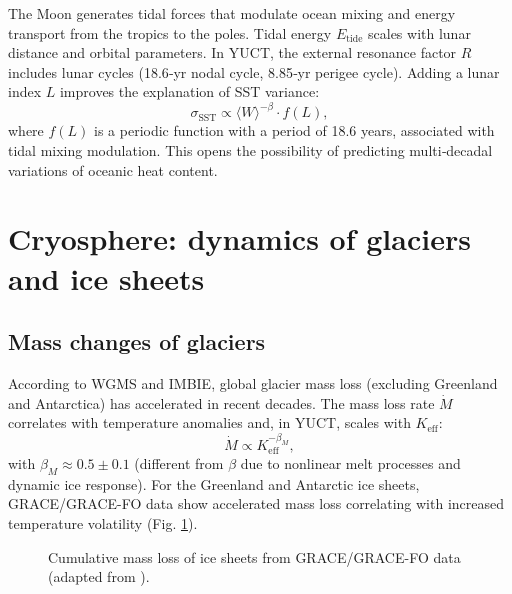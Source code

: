 \documentclass[12pt,a4paper]{article}
\newcommand{\Keff}{K_{\mathrm{eff}}}
\newcommand{\be}{\beta}
\begin{document}
	The Moon generates tidal forces that modulate ocean mixing and energy transport from the tropics to the poles. Tidal energy \(E_{\text{tide}}\) scales with lunar distance and orbital parameters. In YUCT, the external resonance factor \(R\) includes lunar cycles (18.6‑yr nodal cycle, 8.85‑yr perigee cycle). Adding a lunar index \(L\) improves the explanation of SST variance:
	\[
	\sigma_{\text{SST}} \propto \langle W \rangle^{-\be} \cdot f(L),
	\]
	where \(f(L)\) is a periodic function with a period of 18.6 years, associated with tidal mixing modulation. This opens the possibility of predicting multi‑decadal variations of oceanic heat content.
	
	\section{Cryosphere: dynamics of glaciers and ice sheets}
	
	\subsection{Mass changes of glaciers}
	
	According to WGMS and IMBIE, global glacier mass loss (excluding Greenland and Antarctica) has accelerated in recent decades. The mass loss rate \(\dot{M}\) correlates with temperature anomalies and, in YUCT, scales with \(\Keff\):
	\[
	\dot{M} \propto \Keff^{-\beta_M},
	\]
	with \(\beta_M \approx 0.5 \pm 0.1\) (different from \(\be\) due to nonlinear melt processes and dynamic ice response). For the Greenland and Antarctic ice sheets, GRACE/GRACE-FO data show accelerated mass loss correlating with increased temperature volatility (Fig. \ref{fig:grace}).
	
	\begin{figure}[htbp]
		\centering
		\caption{Cumulative mass loss of ice sheets from GRACE/GRACE-FO data (adapted from \cite{IMBIE}).}
		\label{fig:grace}
	\end{figure}
	
\end{document}
